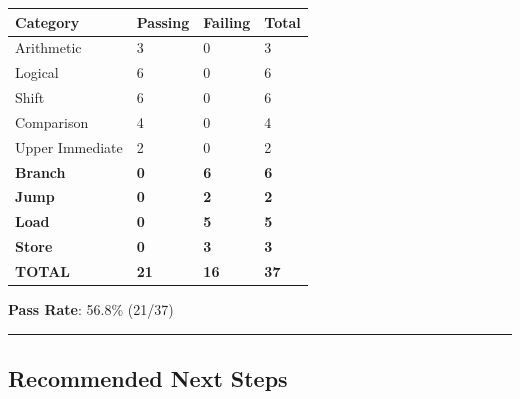 \begin{record}

{
\begin{longtable}[]{@{}llll@{}}
\toprule\noalign{}
Category & Passing & Failing & Total \\
\midrule\noalign{}
\endhead
\bottomrule\noalign{}
\endlastfoot
Arithmetic & 3 & 0 & 3 \\
Logical & 6 & 0 & 6 \\
Shift & 6 & 0 & 6 \\
Comparison & 4 & 0 & 4 \\
Upper Immediate & 2 & 0 & 2 \\
\textbf{Branch} & \textbf{0} & \textbf{6} & \textbf{6} \\
\textbf{Jump} & \textbf{0} & \textbf{2} & \textbf{2} \\
\textbf{Load} & \textbf{0} & \textbf{5} & \textbf{5} \\
\textbf{Store} & \textbf{0} & \textbf{3} & \textbf{3} \\
\textbf{TOTAL} & \textbf{21} & \textbf{16} & \textbf{37} \\
\end{longtable}
}

\textbf{Pass Rate}: 56.8\% (21/37)

\begin{center}\rule{0.5\linewidth}{0.5pt}\end{center}

\end{record}

\subsection{\texorpdfstring{\notemark{} Recommended Next
Steps}{ Recommended Next Steps}}\label{cr:fix:rtl-bug-fixes:wrench-recommended-next-steps}

